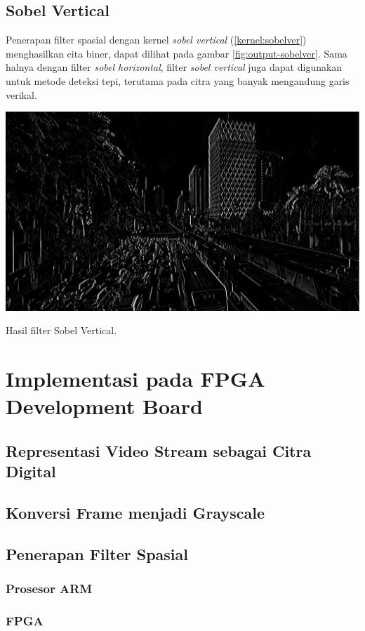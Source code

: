 \subsection{Sobel Vertical}
Penerapan filter spasial dengan kernel \textit{sobel vertical} (\ref{kernel:sobelver}) menghasilkan cita biner, dapat dilihat pada gambar \ref{fig:output-sobelver}. Sama halnya dengan filter \textit{sobel horizontal}, filter \textit{sobel vertical} juga dapat digunakan untuk metode deteksi tepi, terutama pada citra yang banyak mengandung garis verikal.
\begin{afigure}
    \includegraphics[width=0.8\linewidth, center]{images/output-image/input1-sobelver.png}
    \caption{Hasil filter Sobel Vertical.}
    \label{fig:output-sobelver}
\end{afigure}


\section{Implementasi pada FPGA Development Board}
\blindtext
\subsection{Representasi Video Stream sebagai Citra Digital}
\subsection{Konversi Frame menjadi Grayscale}
\subsection{Penerapan Filter Spasial}
\subsubsection{Prosesor ARM}
\subsubsection{FPGA}
